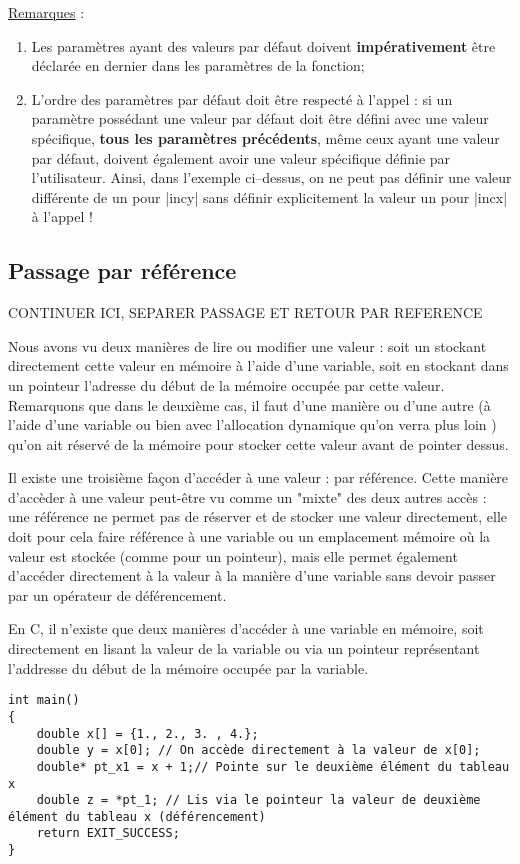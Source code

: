 \underline{Remarques} :
\begin{enumerate}
    \item Les paramètres ayant des valeurs par défaut doivent \textbf{impérativement} être déclarée en dernier dans les paramètres de la fonction;
    \item L'ordre des paramètres par défaut doit être respecté à l'appel : si un paramètre possédant une valeur par défaut doit être défini avec une valeur spécifique, \textbf{tous les paramètres précédents}, même ceux ayant une valeur par défaut, doivent également avoir une valeur spécifique définie par l'utilisateur. Ainsi, dans l'exemple ci--dessus, on ne peut pas définir une valeur différente de un pour |incy| sans définir explicitement la valeur un pour |incx| à l'appel !
\end{enumerate}

\subsection{Passage par référence}

CONTINUER ICI, SEPARER PASSAGE ET RETOUR PAR REFERENCE

Nous avons vu deux manières de lire ou modifier une valeur : soit un stockant directement   cette valeur
en mémoire à l'aide d'une variable, soit en stockant dans un pointeur l'adresse du début de la mémoire occupée par cette valeur. Remarquons que dans le deuxième cas, il faut d'une manière ou d'une autre (à l'aide d'une variable ou bien avec l'allocation dynamique qu'on verra plus loin ) qu'on ait réservé
de la mémoire pour stocker cette valeur avant de pointer dessus.

Il existe une troisième façon d'accéder à une valeur : par référence. Cette manière d'accèder à une valeur peut-être vu comme un "mixte" des deux autres accès : une référence ne permet pas de réserver et de stocker une valeur directement, elle doit pour cela faire référence à une variable ou un emplacement mémoire où la valeur est stockée (comme pour un pointeur), mais elle permet également d'accéder directement à la valeur à la manière d'une variable sans devoir passer par un opérateur de déférencement. 

En C, il n'existe que deux manières d'accéder à une variable en mémoire, soit directement en lisant la valeur de la variable  ou via un pointeur représentant l'addresse du début de la mémoire occupée par la variable.

\begin{lstlisting}
int main()
{
    double x[] = {1., 2., 3. , 4.};
    double y = x[0]; // On accède directement à la valeur de x[0];
    double* pt_x1 = x + 1;// Pointe sur le deuxième élément du tableau x
    double z = *pt_1; // Lis via le pointeur la valeur de deuxième élément du tableau x (déférencement)
    return EXIT_SUCCESS;    
}
\end{lstlisting}

